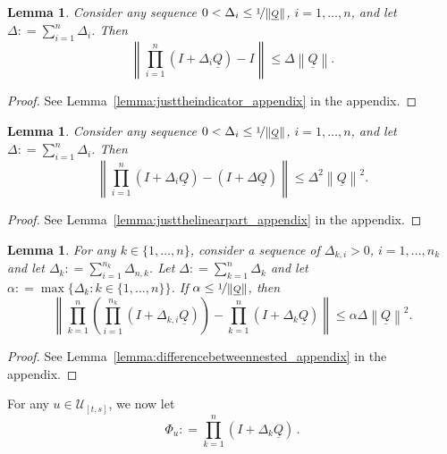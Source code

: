\documentclass[10pt]{paper}
\newtheorem{lemma}[theorem]{Lemma}
\newcommand{\lrate}{\underline{Q}}
\newcommand{\norm}[1]{\left\lVert #1 \right\rVert}
\newcommand{\coloneqq}{:\!=}
\begin{document}
\begin{lemma}\label{lemma:justtheindicator}
Consider any sequence $0<\Delta_i\leq\nicefrac{1}{\norm{\lrate}}$, $i=1,\dots,n$, and let $\Delta\coloneqq\sum_{i=1}^n\Delta_i$. Then
\begin{equation*}
\norm{\prod_{i=1}^n(I+\Delta_i\lrate)-I}\leq\Delta\norm{\lrate}.
\end{equation*}
\end{lemma}
\begin{proof}
See Lemma~\ref{lemma:justtheindicator_appendix} in the appendix.
\end{proof}

\begin{lemma}\label{lemma:justthelinearpart}
Consider any sequence $0<\Delta_i\leq\nicefrac{1}{\norm{\lrate}}$, $i=1,\dots,n$, and let $\Delta\coloneqq\sum_{i=1}^n\Delta_i$. Then
\begin{equation*}
\norm{\prod_{i=1}^n(I+\Delta_i\lrate)-(I+\Delta\lrate)}\leq\Delta^2\norm{\lrate}^2.
\end{equation*}
\end{lemma}
\begin{proof}
See Lemma~\ref{lemma:justthelinearpart_appendix} in the appendix.
\end{proof}

\begin{lemma}\label{lemma:differencebetweennested}
For any $k\in\{1,\dots,n\}$, consider a sequence of $\Delta_{k,i}>0$, $i=1,\dots,n_k$ and let $\Delta_k\coloneqq\sum_{i=1}^{n_k}\Delta_{n,k}$. Let $\Delta\coloneqq\sum_{k=1}^n\Delta_k$ and let $\alpha\coloneqq\max\{\Delta_k\colon k\in\{1,\dots,n\}\}$. If $\alpha\leq\nicefrac{1}{\norm{\lrate}}$, then
\begin{equation*}
\norm{\prod_{k=1}^n\left(\prod_{i=1}^{n_k}(I+\Delta_{k,i}\lrate)\right)
-
\prod_{k=1}^n(I+\Delta_k\lrate)
}
\leq\alpha\Delta\norm{\lrate}^2.
\end{equation*}
\end{lemma}
\begin{proof}
See Lemma~\ref{lemma:differencebetweennested_appendix} in the appendix.
\end{proof}

\noindent For any $u\in\mathcal{U}_{[t,s]}$, we now let
\begin{equation*}
\Phi_u\coloneqq\prod_{k=1}^n(I+\Delta_k\lrate)\,.
\end{equation*}
\end{document}
